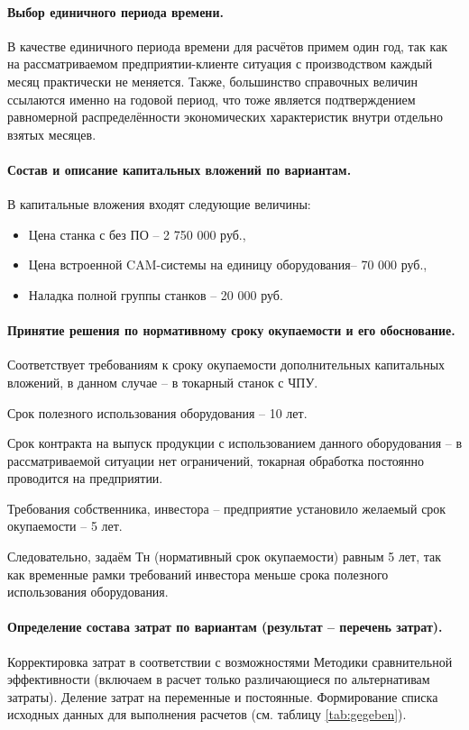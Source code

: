 \paragraph{Выбор единичного периода времени.} В качестве единичного периода времени для расчётов примем один год, так как на рассматриваемом предприятии-клиенте ситуация с производством каждый месяц практически не меняется. Также, большинство справочных величин ссылаются именно на годовой период, что тоже является подтверждением равномерной распределённости экономических характеристик внутри отдельно взятых месяцев.

\paragraph{Состав и описание капитальных вложений по вариантам.} В капитальные вложения входят следующие величины:

\begin{itemize}
	\item Цена станка с без ПО – 2 750 000 руб.,
	\item Цена встроенной CAM-системы на единицу оборудования– 70 000 руб.,
	\item Наладка полной группы станков – 20 000 руб.
\end{itemize}

\paragraph{Принятие решения по нормативному сроку окупаемости и его обоснование.} Соответствует требованиям к сроку окупаемости дополнительных капитальных вложений, в данном случае – в токарный станок с ЧПУ.

Срок полезного использования оборудования – 10 лет.

Срок контракта на выпуск продукции с использованием данного оборудования – в рассматриваемой ситуации нет ограничений, токарная обработка постоянно проводится на предприятии.

Требования собственника, инвестора – предприятие установило желаемый срок окупаемости – 5 лет.

Следовательно, задаём Тн (нормативный срок окупаемости) равным 5 лет, так как временные рамки требований инвестора меньше срока полезного использования оборудования.

\paragraph{Определение состава затрат по вариантам (результат – перечень затрат).} Корректировка затрат в соответствии с возможностями Методики сравнительной эффективности (включаем в расчет только различающиеся по альтернативам затраты). Деление затрат на переменные и постоянные. Формирование списка исходных данных для выполнения расчетов (см. таблицу \ref{tab:gegeben}).


